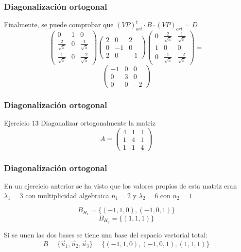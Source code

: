 \documentclass{beamer}
\begin{document}
\begin{frame}
\frametitle{Diagonalizaci\'on ortogonal}
Finalmente, se puede comprobar que $(VP)_{ort}^t\cdot B \cdot (VP)_{ort} = D$
\[ \left(\begin{array}{ccc} 0 & 1& 0 \\\frac{2}{\sqrt 5}  & 0 & \frac{1}{\sqrt 5}  \\ \frac{1}{\sqrt 5} & 0 & \frac{-2}{\sqrt 5}\end{array}\right)    \left(\begin{array}{ccc} 2 & 0& 2 \\ 0  & -1 & 0  \\2 & 0 & -1 \end{array}\right)        \left(\begin{array}{ccc} 0 & \frac{2}{\sqrt 5} & \frac{1}{\sqrt 5} \\1 & 0 & 0 \\0 & \frac{1}{\sqrt 5} & \frac{-2}{\sqrt 5}\end{array}\right) =\]
\[ \left(\begin{array}{ccc}-1 & 0& 0 \\ 0  & 3 & 0  \\ 0 & 0 & -2\end{array}\right)   \]
\end{frame}



\begin{frame}
\frametitle{Diagonalizaci\'on ortogonal}
\begin{block}{Ejercicio 13}
Diagonalizar ortogonalmente la matriz \[A=\left(\begin{array}{ccc}4 & 1 & 1 \\1 & 4 & 1 \\1 & 1 & 4\end{array}\right)\]
\end{block}
\end{frame}




\begin{frame}
\frametitle{Diagonalizaci\'on ortogonal}
En un ejercicio anterior se ha visto que los valores propios de esta matriz eran $\lambda_1 = 3$ con multiplicidad algebraica $n_1=2$ y $\lambda_2 = 6$ con $n_2=1$

\[B_{H_1} =  \{(-1,1,0), (-1,0,1)\}\]
\[B_{H_2} = \{(1,1,1)\}\]

Si se unen las dos bases se tiene una base del espacio vectorial total:
\[B=\{\vec u_1, \vec u_2, \vec u_3\} = \{(-1,1,0),(-1,0,1),(1,1,1)\}\] 
\end{frame}
\end{document}
